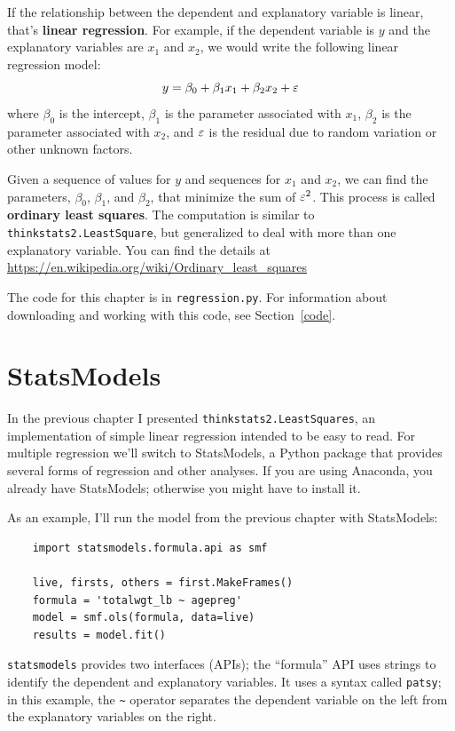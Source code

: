 \documentclass[12pt]{book}
\begin{document}
If the relationship between the dependent and explanatory variable
is linear, that's {\bf linear regression}.  For example,
if the dependent variable is $y$ and the explanatory variables
are $x_1$ and $x_2$, we would write the following linear
regression model:
%
\[ y = \beta_0 + \beta_1 x_1 + \beta_2 x_2 + \varepsilon \]
%
where $\beta_0$ is the intercept, $\beta_1$ is the parameter
associated with $x_1$, $\beta_2$ is the parameter associated with
$x_2$, and $\varepsilon$ is the residual due to random variation or other
unknown factors.

Given a sequence of values for $y$ and sequences for $x_1$ and $x_2$,
we can find the parameters, $\beta_0$, $\beta_1$, and $\beta_2$, that
minimize the sum of $\varepsilon^2$.  This process is called
{\bf ordinary least squares}.  The computation is similar to {\tt
  thinkstats2.LeastSquare}, but generalized to deal with more than one
explanatory variable.  You can find the details at
\url{https://en.wikipedia.org/wiki/Ordinary_least_squares}

The code for this chapter is in {\tt regression.py}.  For information
about downloading and working with this code, see Section~\ref{code}.

\section{StatsModels}
\label{statsmodels}

In the previous chapter I presented {\tt thinkstats2.LeastSquares}, an
implementation of simple linear regression intended to be easy to
read.  For multiple regression we'll switch to StatsModels, a Python
package that provides several forms of regression and other
analyses.  If you are using Anaconda, you already have StatsModels;
otherwise you might have to install it.

As an example, I'll run the model from the previous chapter with
StatsModels:

\begin{verbatim}
    import statsmodels.formula.api as smf

    live, firsts, others = first.MakeFrames()
    formula = 'totalwgt_lb ~ agepreg'
    model = smf.ols(formula, data=live)
    results = model.fit()
\end{verbatim}

{\tt statsmodels} provides two interfaces (APIs); the ``formula''
API uses strings to identify the dependent and explanatory variables.
It uses a syntax called {\tt patsy}; in this example, the \verb"~"
operator separates the dependent variable on the left from the
explanatory variables on the right.
\end{document}
